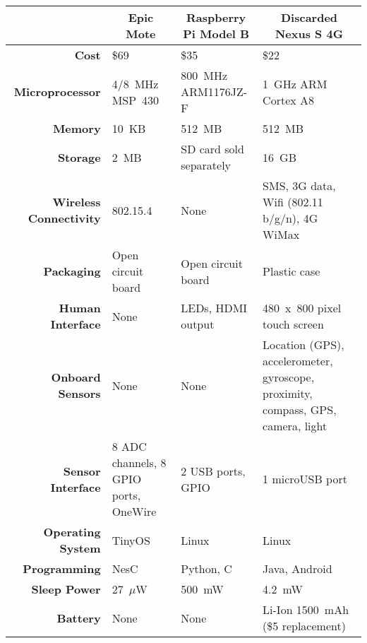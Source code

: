 \renewcommand{\arraystretch}{1.2}
\begin{table*}[t]
\begin{threeparttable}
{\footnotesize
\begin{tabularx}{\textwidth}{rXXX}

&
\multicolumn{1}{c}{\textbf{Epic Mote}} &
\multicolumn{1}{c}{\textbf{Raspberry Pi Model B}} &
\multicolumn{1}{c}{\textbf{Discarded Nexus S 4G}} \\ \toprule

\textbf{Cost} &
\$69 &
\$35 &
\$22\tnote{1} \\ \midrule

\textbf{Microprocessor} &
4/8~MHz MSP~430 &
800~MHz\tnote{2} ARM1176JZ-F &
1~GHz\tnote{2} ARM Cortex A8 \\

\textbf{Memory} &
10~KB &
512~MB &
512~MB \\

\textbf{Storage} &
2~MB &
SD card sold separately\tnote{3} &
16~GB \\ \midrule

\textbf{Wireless Connectivity} &
802.15.4 &
None &
SMS, 3G data, Wifi (802.11 b/g/n), 4G WiMax \\ \midrule

\textbf{Packaging} &
Open circuit board &
Open circuit board &
Plastic case \\

\textbf{Human Interface} &
None &
LEDs, HDMI output &
480~x~800 pixel touch screen \\ \midrule

\textbf{Onboard Sensors} &
None &
None &
Location (GPS), accelerometer, gyroscope, proximity, compass, GPS, camera,
light \\

\textbf{Sensor Interface} &
8 ADC channels, 8 GPIO ports, OneWire &
2 USB ports, GPIO &
1 microUSB port \\ \midrule

\textbf{Operating System} &
TinyOS &
Linux &
Linux \\

\textbf{Programming} &
NesC &
Python, C &
Java, Android \\ \midrule


\textbf{Sleep Power} &
27~$\mu$W &
500~mW\tnote{4} &
4.2~mW \\

\textbf{Battery} &
None &
None &
Li-Ion 1500~mAh (\$5 replacement) \\ \midrule


\end{tabularx}}
\end{threeparttable}
\end{table*}
